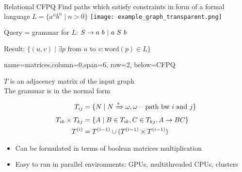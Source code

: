 \documentclass[a0paper,portrait]{baposter}
\begin{document}
\begin{poster}
\begin{posterbox}[name=CFPQ,column=0,row=0, span=4]{Relational CFPQ}
  Find paths which satisfy constraints in form of a formal language $L=\{a^n b^n \mid n > 0\}$
    \texttt{[image: example\_graph\_transparent.png]}

    Query = grammar for $L$: $S  \rightarrow a  \ b \ | \ a \ S \ b  \\$

  Result: $ \{(u,v) \mid \exists p \text{ from } u \text{ to } v: \text{word}(p) \in L\} $

\end{posterbox}

{name=matrices,column=0,span=6, row=2, below=CFPQ}%
{

$T$ is an adjacency matrix of the input graph\\
The grammar is in the normal form
\vspace{-0.5cm}

\begin{align*}
T_{ij} &=\{ N \mid N \xRightarrow[]{*} \omega,  \omega \text{ -- path bw } i \text{ and } j \} \\
T_{ik} \times T_{kj} &= \{ A \mid B \in T_{ik}, C \in T_{kj}, A \rightarrow B C \} \\
T^{(i)} &= T^{(i-1)} \cup (T^{(i-1)} \times T^{(i-1)})
\end{align*}

\begin{itemize}
  \item Can be formulated in terms of boolean matrices multiplication
  \item Easy to run in parallel environments: GPUs, multithreaded CPUs, clusters
\end{itemize}
\vspace{0.1cm}
}



\end{poster}
\end{document}
